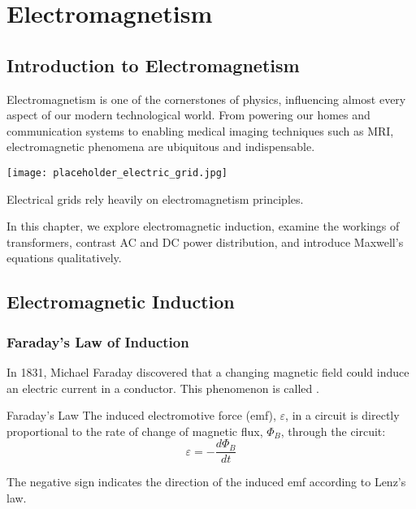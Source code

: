 \chapter{Electromagnetism}

\section{Introduction to Electromagnetism}
\FloatBarrier

Electromagnetism is one of the cornerstones of physics, influencing almost every aspect of our modern technological world. From powering our homes and communication systems to enabling medical imaging techniques such as MRI, electromagnetic phenomena are ubiquitous and indispensable.

\begin{marginfigure}[0pt]
\texttt{[image: placeholder\_electric\_grid.jpg]}
\caption{Electrical grids rely heavily on electromagnetism principles.}
\end{marginfigure}

In this chapter, we explore electromagnetic induction, examine the workings of transformers, contrast AC and DC power distribution, and introduce Maxwell's equations qualitatively.

\section{Electromagnetic Induction}
\FloatBarrier

\subsection{Faraday's Law of Induction}
\FloatBarrier

In 1831, Michael Faraday discovered that a changing magnetic field could induce an electric current in a conductor. This phenomenon is called .


\begin{keyconcept}{Faraday's Law}
The induced electromotive force (emf), \(\varepsilon\), in a circuit is directly proportional to the rate of change of magnetic flux, \(\Phi_B\), through the circuit:
\[
\varepsilon = -\frac{d\Phi_B}{dt}
\]
\end{keyconcept}

The negative sign indicates the direction of the induced emf according to Lenz's law.

